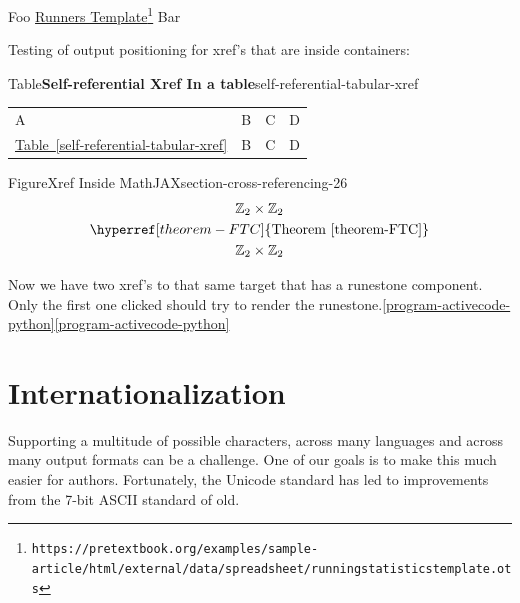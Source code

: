 \documentclass{amsart}
\theoremstyle{plain}%
\theoremstyle{definition}%
\theoremstyle{remark}%
\newcommand{\tabularfont}{\relax}
\newcommand{\xreffont}{\relax}
\numberwithin{equation}{section}
\newcommand{\hrulemedium}{\noalign{\hrule height 0.07em}}
\begin{document}
\par
Foo \href{https://pretextbook.org/examples/sample-article/html/external/data/spreadsheet/runningstatisticstemplate.ots}{Runners Template}\footnote{\nolinkurl{https://pretextbook.org/examples/sample-article/html/external/data/spreadsheet/runningstatisticstemplate.ots}\label{section-cross-referencing-23-2}} Bar%
\par
Testing of output positioning for xref's that are inside containers:%
\begin{tableptx}{Table}{\textbf{Self-referential Xref In a table}}{self-referential-tabular-xref}{}%
\centering%
{\tabularfont%
\begin{tabular}{llll}
A&B&C&D\tabularnewline\hrulemedium
\hyperref[self-referential-tabular-xref]{Table~{\xreffont\ref{self-referential-tabular-xref}}}&B&C&D
\end{tabular}
}%
\end{tableptx}%
\begin{figureptx}{Figure}{Xref Inside MathJAX}{section-cross-referencing-26}{}%
\centering
%
\begin{gather*}
{\mathbb Z}_2 \times {\mathbb Z}_2\\
\hyperref[theorem-FTC]{\text{Theorem {\xreffont\ref{theorem-FTC}}}}\\
{\mathbb Z}_2 \times {\mathbb Z}_2
\end{gather*}
%
\tcblower
\end{figureptx}%
Now we have two xref's to that same target that has a runestone component. Only the first one clicked should try to render the runestone.\hyperref[program-activecode-python]{{\xreffont\ref{program-activecode-python}}}\hyperref[program-activecode-python]{{\xreffont\ref{program-activecode-python}}}%
%
%
\typeout{************************************************}
\typeout{************************************************}
%
\section{Internationalization}\label{section-internationalization}%
%
Supporting a multitude of possible characters, across many languages and across many output formats can be a challenge.  One of our goals is to make this much easier for authors.  Fortunately, the Unicode standard has led to improvements from the 7-bit ASCII standard of old.%
\end{document}
